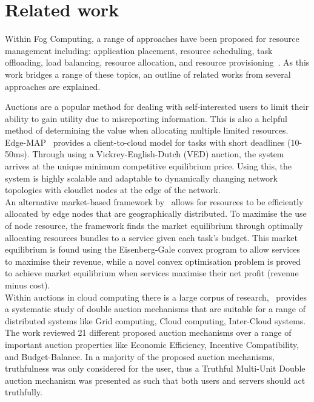 \section{Related work}
\label{sec:related-work}
Within Fog Computing, a range of approaches have been proposed for resource management including:
application placement, resource scheduling, task offloading, load balancing, resource allocation,
and resource provisioning~\cite{ghobaei2019resource}. As this work bridges a range of these topics, an outline of
related works from several approaches are explained.

Auctions are a popular method for dealing with self-interested users to limit their ability to gain utility due to misreporting
information. This is also a helpful method of determining the value when allocating multiple limited
resources. Edge-MAP~\cite{tasiopoulos2018edge} provides a client-to-cloud model for tasks with short deadlines
(10-50ms). Through using a Vickrey-English-Dutch (VED) auction, the system arrives at the unique minimum competitive
equilibrium price. Using this, the system is highly scalable and adaptable to dynamically changing network topologies
with cloudlet nodes at the edge of the network. \\
An alternative market-based framework by~\cite{8373684} allows for resources to be efficiently allocated by edge nodes that
are geographically distributed. To maximise the use of node resource, the framework finds the market
equilibrium through optimally allocating resources bundles to a service given each task's budget. This market
equilibrium is found using the Eisenberg-Gale convex program to allow services to maximise their revenue, while a novel
convex optimisation problem is proved to achieve market equilibrium when services maximise their net profit
(revenue minus cost). \\
Within auctions in cloud computing there is a large corpus of research,~\cite{KUMAR2017234} provides a systematic study
of double auction mechanisms that are suitable for a range of distributed systems like Grid computing, Cloud computing,
Inter-Cloud systems. The work reviewed 21 different proposed auction mechanisms over a range of important auction
properties like Economic Efficiency, Incentive Compatibility, and Budget-Balance. In a majority of the proposed auction
mechanisms, truthfulness was only considered for the user, thus a Truthful Multi-Unit Double auction mechanism was
presented as such that both users and servers should act truthfully.

